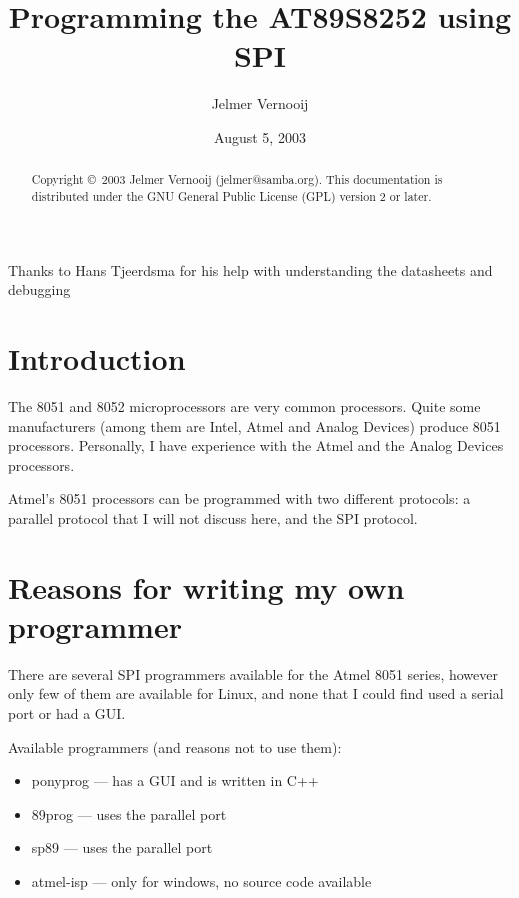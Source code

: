 \documentclass[a4paper]{article}
\begin{document}
\title{Programming the AT89S8252 using SPI}
\date{August 5, 2003}
\author{Jelmer Vernooij}
\maketitle

\begin{center}
	Thanks to Hans Tjeerdsma for his help with understanding the datasheets and debugging
\end{center}

\begin{abstract}
    Copyright \copyright\ 2003  Jelmer Vernooij (jelmer@samba.org).
	This documentation is distributed under the GNU General Public License (GPL) version 2 or later.
\end{abstract}

\lstset{language=C}

\tableofcontents

\section{Introduction}

The 8051 and 8052 microprocessors are very common processors. Quite some 
manufacturers (among them are Intel, Atmel and Analog Devices) produce 8051
processors. Personally, I have experience with the Atmel and the Analog Devices
processors. 

Atmel's 8051 processors can be programmed with two different protocols: 
a parallel protocol that I will not discuss here, and the SPI protocol. 

\section{Reasons for writing my own programmer}

There are several SPI programmers available for the Atmel 8051 series, however
only few of them are available for Linux, and none that I could find used 
a serial port or had a GUI.

Available programmers (and reasons not to use them):

\begin{itemize}
\item ponyprog --- has a GUI and is written in C++
\item 89prog --- uses the parallel port
\item sp89 --- uses the parallel port
\item atmel-isp --- only for windows, no source code available
\end{itemize}
\end{document}
